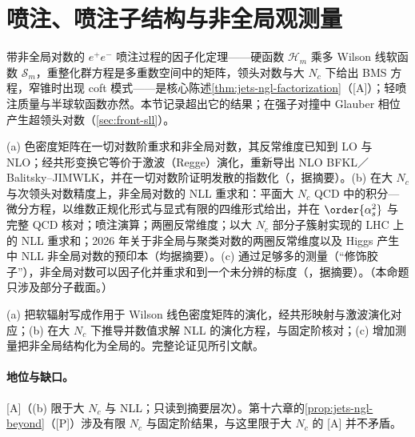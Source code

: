 \section{喷注、喷注子结构与非全局观测量}\label{sec:front-jets}

带非全局对数的 $e^+e^-$ 喷注过程的因子化定理\cite{Becher:2015hka,Becher:2016mmh}——硬函数 $\mathcal H_m$ 乘多 Wilson 线软函数 $\mathcal S_m$，重整化群方程是多重数空间中的矩阵，领头对数与大 $N_c$ 下给出 BMS 方程，窄锥时出现 coft 模式——是核心陈述\cref{thm:jets-ngl-factorization}（[A]）；轻喷注质量与半球软函数\cite{Becher:2016omr}亦然。本节记录超出它的结果；在强子对撞中 Glauber 相位产生超领头对数（\cref{sec:front-sll}）。

\begin{proposition}\label{prop:front-ngl}
(a) 色密度矩阵在一切对数阶重求和非全局对数，其反常维度已知到 LO 与 NLO；经共形变换它等价于激波（Regge）演化，重新导出 NLO BFKL／Balitsky--JIMWLK，并在一切对数阶证明发散的指数化（\cite{Caron-Huot:2015bja}，据摘要）。(b) 在大 $N_c$ 与次领头对数精度上，非全局对数的 NLL 重求和：平面大 $N_c$ QCD 中的积分—微分方程，以维数正规化形式与显式有限的四维形式给出，并在 $\order{\alpha_s^2}$ 与完整 QCD 核对\cite{Banfi:2021owj}；喷注演算\cite{Banfi:2021xzn}；两圈反常维度\cite{Becher:2021urs}；以大 $N_c$ 部分子簇射实现的 LHC 上的 NLL 重求和\cite{Becher:2023vrh}；2026 年关于非全局与聚类对数的两圈反常维度\cite{Becher:2026zon}以及 Higgs 产生中 NLL 非全局对数\cite{Becher:2026iim}的预印本（均据摘要）。(c) 通过足够多的测量（“修饰胶子”），非全局对数可以因子化并重求和到一个未分辨的标度（\cite{Larkoski:2015zka}，据摘要）。（本命题只涉及部分子截面。）
\end{proposition}

\begin{proofsketch}
(a) 把软辐射写成作用于 Wilson 线色密度矩阵的演化，经共形映射与激波演化对应；(b) 在大 $N_c$ 下推导并数值求解 NLL 的演化方程，与固定阶核对；(c) 增加测量把非全局结构化为全局的。完整论证见所引文献。
\end{proofsketch}

\paragraph{地位与缺口。}[A]（(b) 限于大 $N_c$ 与 NLL；只读到摘要层次）。第十六章的\cref{prop:jets-ngl-beyond}（[P]）涉及有限 $N_c$ 与固定阶结果，与这里限于大 $N_c$ 的 [A] 并不矛盾。

